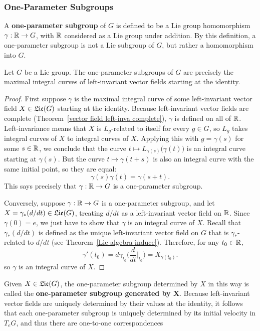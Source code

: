 \subsubsection{One-Parameter Subgroups}
A \textbf{one-parameter subgroup} of $G$ is defined to be a Lie group homomorphism $\gamma:\mathbb{R}\to G$, with $\mathbb{R}$ considered as a Lie group under addition. By this definition, a one-parameter subgroup is not a Lie subgroup of $G$, but rather a homomorphism into $G$.
\begin{theorem}\label{one-para subgroup char}
Let $G$ be a Lie group. The one-parameter subgroups of $G$ are precisely the maximal integral curves of left-invariant vector fields starting at the identity.
\end{theorem}
\begin{proof}
First suppose $\gamma$ is the maximal integral curve of some left-invariant vector field $X\in\mathfrak{Lie}(G)$ starting at the identity. Because left-invariant vector fields are complete (Theorem~\ref{vector field left-inva complete}), $\gamma$ is defined on all of $\mathbb{R}$. Left-invariance means that $X$ is $L_g$-related to itself for every $g\in G$, so $L_g$ takes integral curves of $X$ to integral curves of $X$. Applying this with $g=\gamma(s)$ for some $s\in\mathbb{R}$, we conclude that the curve $t\mapsto L_{\gamma(s)}\big(\gamma(t)\big)$ is an integral curve starting at $\gamma(s)$. But the curve $t\mapsto\gamma(t+s)$ is also an integral curve with the same initial point, so they are equal:
\[\gamma(s)\gamma(t)=\gamma(s+t).\]
This says precisely that $\gamma:\mathbb{R}\to G$ is a one-parameter subgroup.\par
Conversely, suppose $\gamma:\mathbb{R}\to G$ is a one-parameter subgroup, and let $X=\gamma_*(d/dt)\in\mathfrak{Lie}(G)$, treating $d/dt$ as a left-invariant vector field on $\mathbb{R}$. Since $\gamma(0)=e$, we just have to show that $\gamma$ is an integral curve of $X$. Recall that $\gamma_*(d/dt)$ is defined as the unique left-invariant vector field on $G$ that is $\gamma_*$-related to $d/dt$ (see Theorem~\ref{Lie algebra induce}). Therefore, for any $t_0\in\mathbb{R}$,
\[\gamma'(t_0)=d\gamma_{t_0}\Big(\frac{d}{dt}\Big|_{t_0}\Big)=X_{\gamma(t_0)}.\]
so $\gamma$ is an integral curve of $X$.
\end{proof}
Given $X\in\mathfrak{Lie}(G)$, the one-parameter subgroup determined by $X$ in this way is called the \textbf{one-parameter subgroup generated by $\bm{X}$}. Because left-invariant vector fields are uniquely determined by their values at the identity, it follows that each one-parameter subgroup is uniquely determined by its initial velocity in $T_eG$, and thus there are one-to-one correspondences

